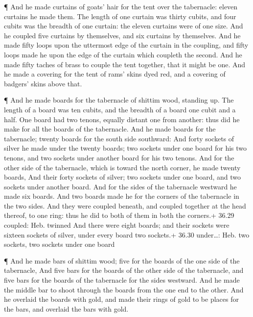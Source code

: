  ¶ And he made curtains of goats' hair for the tent over
the tabernacle: eleven curtains he made them.  The length
of one curtain was thirty cubits, and four cubits was the breadth of one
curtain: the eleven curtains were of one size.  And he
coupled five curtains by themselves, and six curtains by themselves.
 And he made fifty loops upon the uttermost edge of the
curtain in the coupling, and fifty loops made he upon the edge of the
curtain which coupleth the second.  And he made fifty
taches of brass to couple the tent together, that it might be one.
 And he made a covering for the tent of rams' skins dyed
red, and a covering of badgers' skins above that.

 ¶ And he made boards for the tabernacle of shittim wood,
standing up.  The length of a board was ten cubits, and the
breadth of a board one cubit and a half.  One board had two
tenons, equally distant one from another: thus did he make for all the
boards of the tabernacle.  And he made boards for the
tabernacle; twenty boards for the south side southward: 
And forty sockets of silver he made under the twenty boards; two sockets
under one board for his two tenons, and two sockets under another board
for his two tenons.  And for the other side of the
tabernacle, which is toward the north corner, he made twenty boards,
 And their forty sockets of silver; two sockets under one
board, and two sockets under another board.  And for the
sides of the tabernacle westward he made six boards.  And
two boards made he for the corners of the tabernacle in the two sides.
 And they were coupled beneath, and coupled together at the
head thereof, to one ring: thus he did to both of them in both the
corners.+ 36.29 coupled: Heb. twinned  And there were eight
boards; and their sockets were sixteen sockets of silver, under every
board two sockets.+ 36.30 under\ldots: Heb. two sockets, two sockets
under one board

 ¶ And he made bars of shittim wood; five for the boards of
the one side of the tabernacle,  And five bars for the
boards of the other side of the tabernacle, and five bars for the boards
of the tabernacle for the sides westward.  And he made the
middle bar to shoot through the boards from the one end to the other.
 And he overlaid the boards with gold, and made their rings
of gold to be places for the bars, and overlaid the bars with gold.

